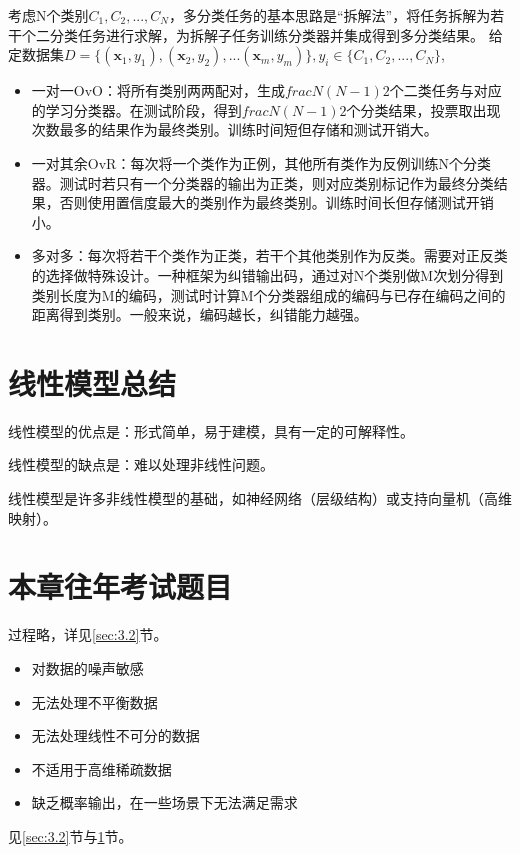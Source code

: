 考虑N个类别$C_1,C_2,...,C_N$，多分类任务的基本思路是“拆解法”，将任务拆解为若干个二分类任务进行求解，为拆解子任务训练分类器并集成得到多分类结果。
给定数据集$
D= \{ (\boldsymbol x_1,y_1),(\boldsymbol x_2,y_2),... (\boldsymbol x_m,y_m) \}, y_i\in\{C_1, C_2,...,C_N \}
$,
\begin{itemize}
    \item 一对一OvO：将所有类别两两配对，生成$frac{N(N-1)}{2}$个二类任务与对应的学习分类器。在测试阶段，得到$frac{N(N-1)}{2}$个分类结果，投票取出现次数最多的结果作为最终类别。训练时间短但存储和测试开销大。
    \item 一对其余OvR：每次将一个类作为正例，其他所有类作为反例训练N个分类器。测试时若只有一个分类器的输出为正类，则对应类别标记作为最终分类结果，否则使用置信度最大的类别作为最终类别。训练时间长但存储测试开销小。
    \item 多对多：每次将若干个类作为正类，若干个其他类别作为反类。需要对正反类的选择做特殊设计。一种框架为纠错输出码，通过对N个类别做M次划分得到类别长度为M的编码，测试时计算M个分类器组成的编码与已存在编码之间的距离得到类别。一般来说，编码越长，纠错能力越强。
\end{itemize}

\begin{figure}[!htbp]
	\centering
\end{figure}

\begin{figure}[!htbp]
	\centering
\end{figure}

\section{线性模型总结}\label{sec:3.5}
线性模型的优点是：形式简单，易于建模，具有一定的可解释性。

线性模型的缺点是：难以处理非线性问题。

线性模型是许多非线性模型的基础，如神经网络（层级结构）或支持向量机（高维映射）。

\section{本章往年考试题目}\label{sec:3.6}

过程略，详见\ref{sec:3.2}节。

\begin{itemize}
    \item 对数据的噪声敏感
    \item 无法处理不平衡数据
    \item 无法处理线性不可分的数据
    \item 不适用于高维稀疏数据
    \item 缺乏概率输出，在一些场景下无法满足需求
\end{itemize}

见\ref{sec:3.2}节与\ref{sec:3.5}节。